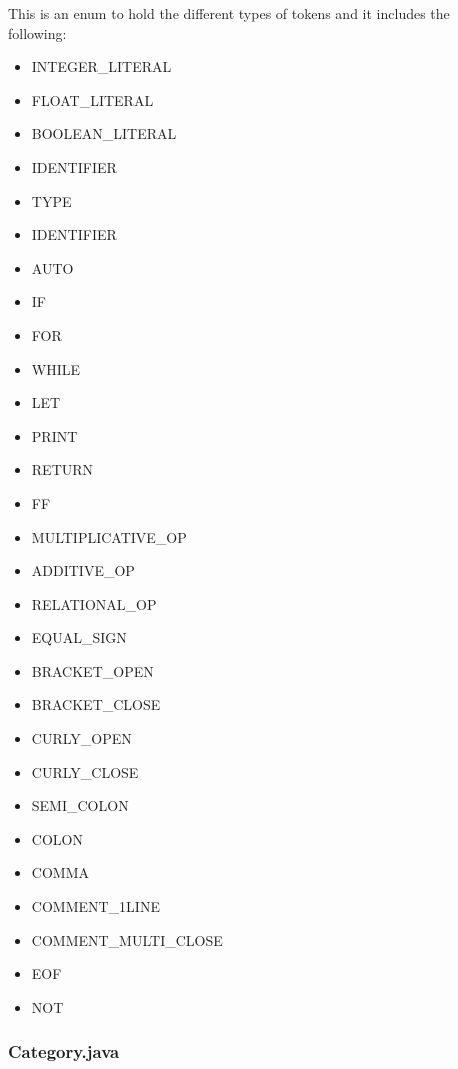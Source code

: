 \documentclass{article}
\begin{document}
					This is an enum to hold the different types of tokens and it includes the following:
					\begin{itemize}
						\item INTEGER\_LITERAL
						\item FLOAT\_LITERAL
						\item BOOLEAN\_LITERAL
						\item IDENTIFIER
			    			\item TYPE
						\item IDENTIFIER
			    			\item AUTO
						\item IF
			    			\item FOR
						\item WHILE
			    			\item LET  
						\item PRINT
			    			\item RETURN
						\item FF
			    			\item MULTIPLICATIVE\_OP
			    			\item ADDITIVE\_OP
			    			\item RELATIONAL\_OP
						\item EQUAL\_SIGN
			    			\item BRACKET\_OPEN  
						\item BRACKET\_CLOSE
			    			\item CURLY\_OPEN
						\item CURLY\_CLOSE
			    			\item SEMI\_COLON
			    			\item COLON
			    			\item COMMA
			    			\item COMMENT\_1LINE
			    			\item COMMENT\_MULTI\_CLOSE
			    			\item EOF
			    			\item NOT
					\end{itemize}
				
				 	\subsubsection{Category.java}
					
\end{document}
